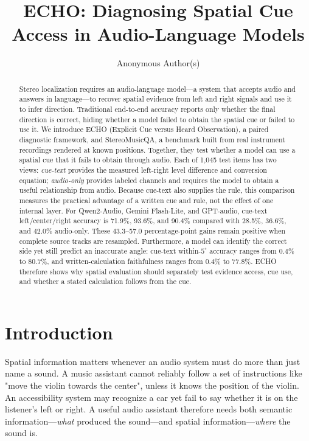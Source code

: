\documentclass{article}
\title{ECHO: Diagnosing Spatial Cue Access in Audio-Language Models}
\author{Anonymous Author(s)}
\begin{document}
\maketitle
\raggedbottom

\begin{abstract}
Stereo localization requires an audio-language model---a system that accepts audio and answers in language---to recover spatial evidence from left and right signals and use it to infer direction. Traditional end-to-end accuracy reports only whether the final direction is correct, hiding whether a model failed to obtain the spatial cue or failed to use it. We introduce ECHO (Explicit Cue versus Heard Observation), a paired diagnostic framework, and StereoMusicQA, a benchmark built from real instrument recordings rendered at known positions. Together, they test whether a model can use a spatial cue that it fails to obtain through audio. Each of 1,045 test items has two views: \emph{cue-text} provides the measured left-right level difference and conversion equation; \emph{audio-only} provides labeled channels and requires the model to obtain a useful relationship from audio. Because cue-text also supplies the rule, this comparison measures the practical advantage of a written cue and rule, not the effect of one internal layer. For Qwen2-Audio, Gemini Flash-Lite, and GPT-audio, cue-text left/center/right accuracy is 71.9\%, 93.6\%, and 90.4\% compared with 28.5\%, 36.6\%, and 42.0\% audio-only. These 43.3--57.0 percentage-point gains remain positive when complete source tracks are resampled. Furthermore, a model can identify the correct side yet still predict an inaccurate angle: cue-text within-\(5^\circ\) accuracy ranges from 0.4\% to 80.7\%, and written-calculation faithfulness ranges from 0.4\% to 77.8\%. ECHO therefore shows why spatial evaluation should separately test evidence access, cue use, and whether a stated calculation follows from the cue.

\end{abstract}

\section{Introduction}
\label{sec:introduction}

Spatial information matters whenever an audio system must do more than just name a sound. A music assistant cannot reliably follow a set of instructions like "move the violin towards the center", unless it knows the position of the violin. An accessibility system may recognize a car yet fail to say whether it is on the listener's left or right. A useful audio assistant therefore needs both semantic information---\emph{what} produced the sound---and spatial information---\emph{where} the sound is.
\end{document}
